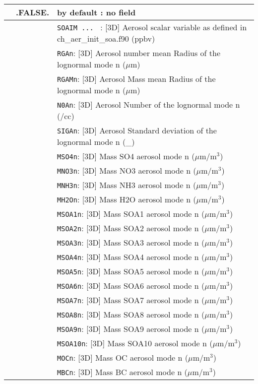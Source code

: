 \begin{center}
\begin{tabular}{|>{\centering}p{3cm}|>{\centering}p{2.5cm}|p{11cm}|}
\hline
\multirow{26}{*}{LCHEMDIAG}\index{LCHEMDIAG!\innam{NAM\_DIAG}}&\textbf{.FALSE.}&  by default : no field\\\cline{2-3}
&\multirow{25}{*}{.TRUE.}  &{\tt SOAIM ... } : [3D] Aerosol scalar variable as defined in ch\_aer\_init\_soa.f90 (ppbv)\\ \cline{3-3}
& &{\tt RGAn}: [3D] Aerosol number mean Radius of the lognormal mode n ($\mu$m)\\\cline{3-3}
&  &{\tt RGAMn}: [3D] Aerosol Mass mean Radius of the lognormal mode n ($\mu$m)\\\cline{3-3}
&  &{\tt N0An}: [3D] Aerosol Number of the lognormal mode n (/cc)
\\\cline{3-3}
& &{\tt SIGAn}: [3D] Aerosol Standard deviation of the lognormal mode n (\_)\\\cline{3-3}
& &{\tt MSO4n}: [3D] Mass SO4 aerosol mode n ($\mu$m/m$^3$)\\\cline{3-3}
& &{\tt MNO3n}: [3D] Mass NO3 aerosol mode n ($\mu$m/m$^3$)\\\cline{3-3}
& &{\tt MNH3n}: [3D] Mass NH3 aerosol mode n ($\mu$m/m$^3$)\\\cline{3-3}
& &{\tt MH2On}: [3D] Mass H2O aerosol mode n ($\mu$m/m$^3$)\\\cline{3-3}
& &{\tt MSOA1n}: [3D] Mass SOA1 aerosol mode n ($\mu$m/m$^3$)\\\cline{3-3}
& &{\tt MSOA2n}: [3D] Mass SOA2 aerosol mode n ($\mu$m/m$^3$)\\\cline{3-3}
& &{\tt MSOA3n}: [3D] Mass SOA3 aerosol mode n ($\mu$m/m$^3$)\\\cline{3-3}
& &{\tt MSOA4n}: [3D] Mass SOA4 aerosol mode n ($\mu$m/m$^3$)\\\cline{3-3}
& &{\tt MSOA5n}: [3D] Mass SOA5 aerosol mode n ($\mu$m/m$^3$)\\\cline{3-3}
& &{\tt MSOA6n}: [3D] Mass SOA6 aerosol mode n ($\mu$m/m$^3$)\\\cline{3-3}
& &{\tt MSOA7n}: [3D] Mass SOA7 aerosol mode n ($\mu$m/m$^3$)\\\cline{3-3}
& &{\tt MSOA8n}: [3D] Mass SOA8 aerosol mode n ($\mu$m/m$^3$)\\\cline{3-3}
& &{\tt MSOA9n}: [3D] Mass SOA9 aerosol mode n ($\mu$m/m$^3$)\\\cline{3-3}
& &{\tt MSOA10n}: [3D] Mass SOA10 aerosol mode n ($\mu$m/m$^3$)\\\cline{3-3}
& &{\tt MOCn}: [3D] Mass OC aerosol mode n ($\mu$m/m$^3$)\\\cline{3-3}
& &{\tt MBCn}: [3D] Mass BC aerosol mode n ($\mu$m/m$^3$)\\\hline
\end{tabular} 
\end{center}

